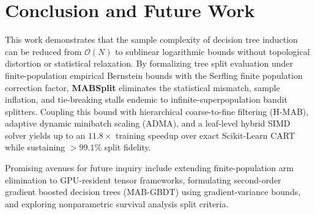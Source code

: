 \section{Conclusion and Future Work}
\label{sec:conclusion}

This work demonstrates that the sample complexity of decision tree induction can be reduced from $\mathcal{O}(N)$ to sublinear logarithmic bounds without topological distortion or statistical relaxation. By formalizing tree split evaluation under finite-population empirical Bernstein bounds with the Serfling finite population correction factor, \textbf{MABSplit} eliminates the statistical mismatch, sample inflation, and tie-breaking stalls endemic to infinite-superpopulation bandit splitters. Coupling this bound with hierarchical coarse-to-fine filtering (H-MAB), adaptive dynamic minibatch scaling (ADMA), and a leaf-level hybrid SIMD solver yields up to an $11.8\times$ training speedup over exact Scikit-Learn CART while sustaining $>99.1\%$ split fidelity.

Promising avenues for future inquiry include extending finite-population arm elimination to GPU-resident tensor frameworks, formulating second-order gradient boosted decision trees (MAB-GBDT) using gradient-variance bounds, and exploring nonparametric survival analysis split criteria.
